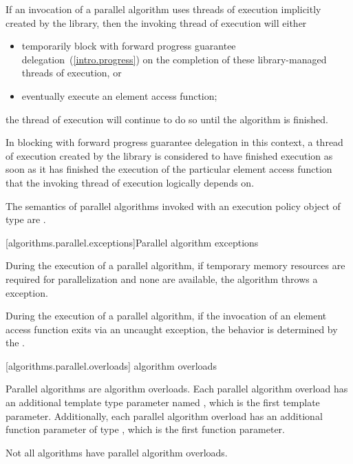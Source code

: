 \pnum
If an invocation of a parallel algorithm uses threads of execution implicitly
created by the library, then the invoking thread of execution will either

\begin{itemize}
\item temporarily block with forward progress guarantee delegation~(\ref{intro.progress})
      on the completion of these library-managed threads of execution, or
\item eventually execute an element access function;
\end{itemize}

the thread of execution will continue to do so until the algorithm is finished.
\begin{note}
In blocking with forward progress guarantee delegation in this context,
a thread of execution created by the library is considered to have
finished execution as soon as it has finished the execution of the
particular element access function that the invoking thread of execution
logically depends on.
\end{note}

\pnum
The semantics of parallel algorithms invoked with an execution policy object of
 type are
.

[algorithms.parallel.exceptions]{Parallel algorithm exceptions}

\pnum
During the execution of a parallel algorithm, if temporary memory resources are
required for parallelization and none are available, the algorithm throws a
 exception.

\pnum
During the execution of a parallel algorithm, if the invocation of an element
access function exits via an uncaught exception,
the behavior is determined by the .

[algorithms.parallel.overloads]{ algorithm overloads}

\pnum
Parallel algorithms are algorithm overloads. Each parallel algorithm overload
has an additional template type parameter named , which
is the first template parameter.
Additionally, each parallel algorithm overload has an additional function
parameter of type , which is the first
function parameter.
\begin{note} Not all algorithms have parallel algorithm overloads.\end{note}

